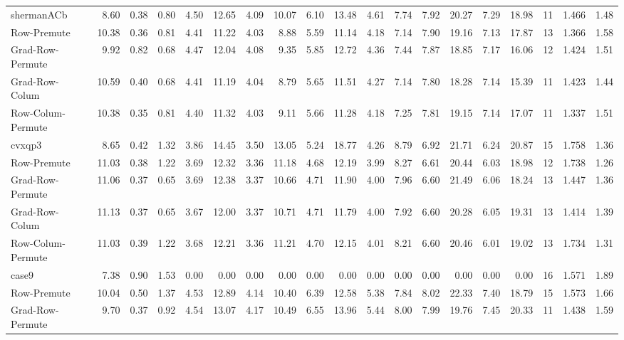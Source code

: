 \begin{table}[hbt]
\begin{tabular}{lrrrrrrrrrrrrrrrrrr}
shermanACb           & 8.60  &0.38 &  0.80 & 4.50 & 12.65 & 4.09 & 10.07  & 6.10  &13.48  & 4.61  & 7.74  &  7.92  &20.27  & 7.29  &18.98  &11  &1.466   &1.48  \\       
Row-Premute          &10.38  &0.36 &  0.81 & 4.41 & 11.22 & 4.03 &  8.88  & 5.59  &11.14  & 4.18  & 7.14  &  7.90  &19.16  & 7.13  &17.87  &13  &1.366   &1.58  \\       
Grad-Row-Permute     & 9.92  &0.82 &  0.68 & 4.47 & 12.04 & 4.08 &  9.35  & 5.85  &12.72  & 4.36  & 7.44  &  7.87  &18.85  & 7.17  &16.06  &12  &1.424   &1.51  \\       
Grad-Row-Colum       &10.59  &0.40 &  0.68 & 4.41 & 11.19 & 4.04 &  8.79  & 5.65  &11.51  & 4.27  & 7.14  &  7.80  &18.28  & 7.14  &15.39  &11  &1.423   &1.44  \\       
Row-Colum-Permute    &10.38  &0.35 &  0.81 & 4.40 & 11.32 & 4.03 &  9.11  & 5.66  &11.28  & 4.18  & 7.25  &  7.81  &19.15  & 7.14  &17.07  &11  &1.337   &1.51  \\ \hline
cvxqp3               & 8.65  &0.42 &  1.32 & 3.86 & 14.45 & 3.50 & 13.05  & 5.24  &18.77  & 4.26  & 8.79  &  6.92  &21.71  & 6.24  &20.87  &15  &1.758   &1.36  \\       
Row-Premute          &11.03  &0.38 &  1.22 & 3.69 & 12.32 & 3.36 & 11.18  & 4.68  &12.19  & 3.99  & 8.27  &  6.61  &20.44  & 6.03  &18.98  &12  &1.738   &1.26  \\       
Grad-Row-Permute     &11.06  &0.37 &  0.65 & 3.69 & 12.38 & 3.37 & 10.66  & 4.71  &11.90  & 4.00  & 7.96  &  6.60  &21.49  & 6.06  &18.24  &13  &1.447   &1.36  \\       
Grad-Row-Colum       &11.13  &0.37 &  0.65 & 3.67 & 12.00 & 3.37 & 10.71  & 4.71  &11.79  & 4.00  & 7.92  &  6.60  &20.28  & 6.05  &19.31  &13  &1.414   &1.39  \\       
Row-Colum-Permute    &11.03  &0.39 &  1.22 & 3.68 & 12.21 & 3.36 & 11.21  & 4.70  &12.15  & 4.01  & 8.21  &  6.60  &20.46  & 6.01  &19.02  &13  &1.734   &1.31  \\ \hline
case9                & 7.38  &0.90 &  1.53 & 0.00 &  0.00 & 0.00 &  0.00  & 0.00  & 0.00  & 0.00  & 0.00  &  0.00  & 0.00  & 0.00  & 0.00  &16  &1.571   &1.89  \\       
Row-Premute          &10.04  &0.50 &  1.37 & 4.53 & 12.89 & 4.14 & 10.40  & 6.39  &12.58  & 5.38  & 7.84  &  8.02  &22.33  & 7.40  &18.79  &15  &1.573   &1.66  \\       
Grad-Row-Permute     & 9.70  &0.37 &  0.92 & 4.54 & 13.07 & 4.17 & 10.49  & 6.55  &13.96  & 5.44  & 8.00  &  7.99  &19.76  & 7.45  &20.33  &11  &1.438   &1.59  \\       

\end{tabular}
\end{table}
